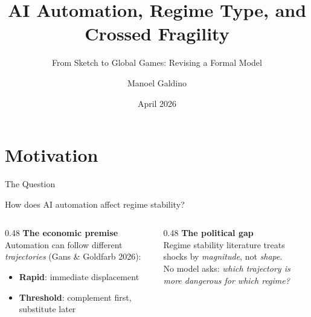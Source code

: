 \documentclass[
  ignorenonframetext,
  aspectratio=169]{beamer}
\title{AI Automation, Regime Type, and Crossed Fragility}
\subtitle{From Sketch to Global Games: Revising a Formal Model}
\author{Manoel Galdino}
\date{April 2026}
\begin{document}
\frame{\titlepage}

\section{Motivation}\label{motivation}

\begin{frame}{The Question}
\protect{}\label{the-question}
\begin{center}
\Large How does AI automation affect regime stability?
\end{center}

\vspace{0.6cm}

\begin{columns}[T]
\begin{column}{0.48\textwidth}
\textbf{The economic premise}\\[4pt]
Automation can follow different \emph{trajectories} (Gans \& Goldfarb 2026):
\begin{itemize}
  \item \textbf{Rapid}: immediate displacement
  \item \textbf{Threshold}: complement first, substitute later
\end{itemize}
\end{column}
\begin{column}{0.48\textwidth}
\textbf{The political gap}\\[4pt]
Regime stability literature treats shocks by \emph{magnitude}, not \emph{shape}.\\[6pt]
No model asks: \emph{which trajectory is more dangerous for which regime?}
\end{column}
\end{columns}
\end{frame}
\end{document}
